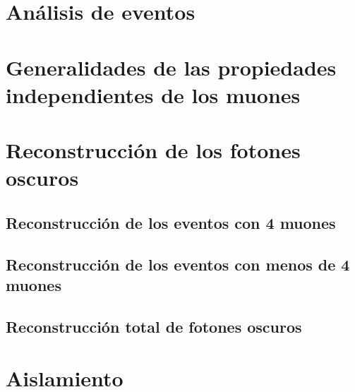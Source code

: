\documentclass[12pt]{report}
\begin{document}
	\section{Análisis de eventos}
    
    
    \section{Generalidades de las propiedades independientes de los muones}
    
    
	\section{Reconstrucción de los fotones oscuros}
	
		\subsection{Reconstrucción de los eventos con 4 muones}
		
		
		\subsection{Reconstrucción de los eventos con menos de 4 muones}	
		
		
		\subsection{Reconstrucción total de fotones oscuros}	
		

    
    \section{Aislamiento}
    

    


\end{document}
